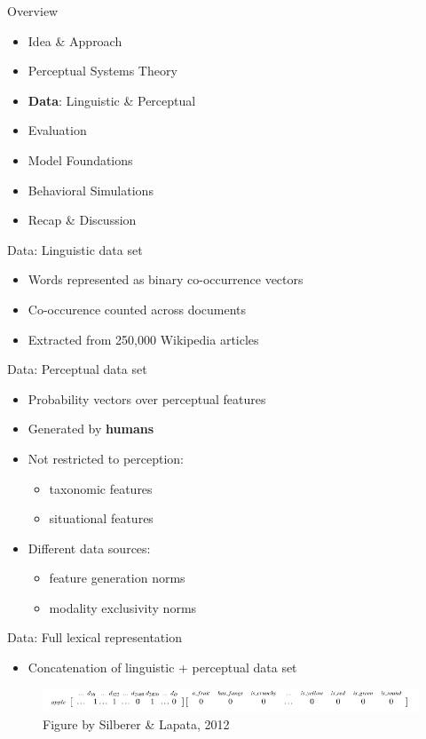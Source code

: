 \documentclass[12pt,a4paper]{beamer}
\begin{document}
\begin{frame}{Overview}
\begin{itemize}
\item Idea \& Approach
\item Perceptual Systems Theory
\item \textbf{Data}: Linguistic \& Perceptual
\item Evaluation
    \item Model Foundations
    \item Behavioral Simulations
\item Recap \& Discussion
\end{itemize}
\end{frame}



\begin{frame}{Data: Linguistic data set}
\begin{itemize}
\item Words represented as binary co-occurrence vectors
\item Co-occurence counted across documents
\item Extracted from 250,000 Wikipedia articles
\end{itemize}
\end{frame}


\begin{frame}{Data: Perceptual data set}
\begin{itemize}
\item Probability vectors over perceptual features
\item Generated by \textbf{humans}
\item Not restricted to perception:
    \begin{itemize}
    \item taxonomic features
    \item situational features
    \end{itemize}
\item Different data sources:
    \begin{itemize}
    \item feature generation norms \cite{mcrae}
    \item modality exclusivity norms \cite{lynott}
    \end{itemize}
\end{itemize}
\end{frame}

\begin{frame}{Data: Full lexical representation}
\begin{itemize}
\item Concatenation of linguistic + perceptual data set
\end{itemize}
\begin{figure}
\includegraphics[width=\textwidth]{silber_lapata_example_lexical_representation_figure_3.png}
\caption{Figure by Silberer \& Lapata, 2012 \cite{silberer}}
\end{figure}
\end{frame}
\end{document}
